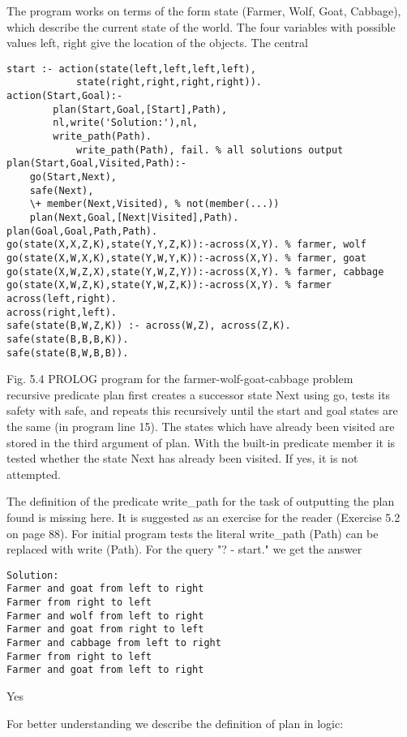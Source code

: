 \documentclass[10pt]{article}
\begin{document}
The program works on terms of the form state (Farmer, Wolf, Goat, Cabbage), which describe the current state of the world. The four variables with possible values left, right give the location of the objects. The central

\begin{verbatim}
start :- action(state(left,left,left,left),
            state(right,right,right,right)).
action(Start,Goal):-
        plan(Start,Goal,[Start],Path),
        nl,write('Solution:'),nl,
        write_path(Path).
            write_path(Path), fail. % all solutions output
plan(Start,Goal,Visited,Path):-
    go(Start,Next),
    safe(Next),
    \+ member(Next,Visited), % not(member(...))
    plan(Next,Goal,[Next|Visited],Path).
plan(Goal,Goal,Path,Path).
go(state(X,X,Z,K),state(Y,Y,Z,K)):-across(X,Y). % farmer, wolf
go(state(X,W,X,K),state(Y,W,Y,K)):-across(X,Y). % farmer, goat
go(state(X,W,Z,X),state(Y,W,Z,Y)):-across(X,Y). % farmer, cabbage
go(state(X,W,Z,K),state(Y,W,Z,K)):-across(X,Y). % farmer
across(left,right).
across(right,left).
safe(state(B,W,Z,K)) :- across(W,Z), across(Z,K).
safe(state(B,B,B,K)).
safe(state(B,W,B,B)).
\end{verbatim}

Fig. 5.4 PROLOG program for the farmer-wolf-goat-cabbage problem\\
recursive predicate plan first creates a successor state Next using go, tests its safety with safe, and repeats this recursively until the start and goal states are the same (in program line 15). The states which have already been visited are stored in the third argument of plan. With the built-in predicate member it is tested whether the state Next has already been visited. If yes, it is not attempted.

The definition of the predicate write\_path for the task of outputting the plan found is missing here. It is suggested as an exercise for the reader (Exercise 5.2 on page 88). For initial program tests the literal write\_path (Path) can be replaced with write (Path). For the query "? - start." we get the answer

\begin{verbatim}
Solution:
Farmer and goat from left to right
Farmer from right to left
Farmer and wolf from left to right
Farmer and goat from right to left
Farmer and cabbage from left to right
Farmer from right to left
Farmer and goat from left to right
\end{verbatim}

Yes

For better understanding we describe the definition of plan in logic:
\end{document}
